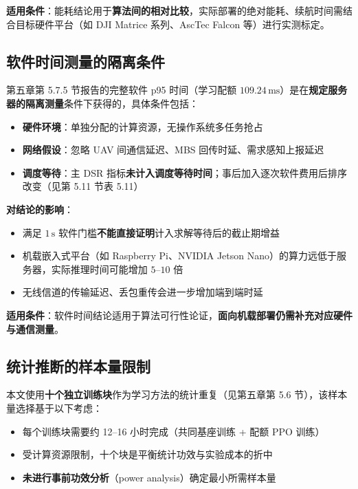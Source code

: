 \textbf{适用条件}：能耗结论用于\textbf{算法间的相对比较}，实际部署的绝对能耗、续航时间需结合目标硬件平台（如 DJI Matrice 系列、AscTec Falcon 等）进行实测标定。

\subsection{软件时间测量的隔离条件}
\label{sec:timing-assumptions}

第五章第 5.7.5 节报告的完整软件 p95 时间（学习配额 $109.24\,\mathrm{ms}$）是在\textbf{规定服务器的隔离测量}条件下获得的，具体条件包括：
\begin{itemize}
    \item \textbf{硬件环境}：单独分配的计算资源，无操作系统多任务抢占
    \item \textbf{网络假设}：忽略 UAV 间通信延迟、MBS 回传时延、需求感知上报延迟
    \item \textbf{调度等待}：主 DSR 指标\textbf{未计入调度等待时间}；事后加入逐次软件费用后排序改变（见第 5.11 节表 5.11）
\end{itemize}

\textbf{对结论的影响}：
\begin{itemize}
    \item 满足 $1\,\mathrm{s}$ 软件门槛\textbf{不能直接证明}计入求解等待后的截止期增益
    \item 机载嵌入式平台（如 Raspberry Pi、NVIDIA Jetson Nano）的算力远低于服务器，实际推理时间可能增加 $5$--$10$ 倍
    \item 无线信道的传输延迟、丢包重传会进一步增加端到端时延
\end{itemize}

\textbf{适用条件}：软件时间结论适用于算法可行性论证，\textbf{面向机载部署仍需补充对应硬件与通信测量}。

\subsection{统计推断的样本量限制}
\label{sec:statistical-assumptions}

本文使用\textbf{十个独立训练块}作为学习方法的统计重复（见第五章第 5.6 节），该样本量选择基于以下考虑：
\begin{itemize}
    \item 每个训练块需要约 12--16 小时完成（共同基座训练 + 配额 PPO 训练）
    \item 受计算资源限制，十个块是平衡统计功效与实验成本的折中
    \item \textbf{未进行事前功效分析}（power analysis）确定最小所需样本量
\end{itemize}

